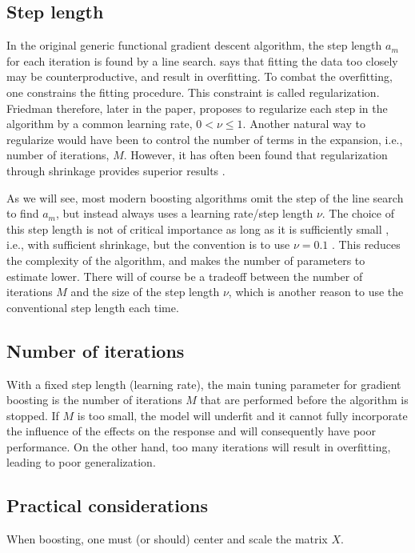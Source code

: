 \subsection{Step length}
In the original generic functional gradient descent algorithm, the step length $a_m$ for each iteration is found by a line search.
\citet{friedman2001} says that fitting the data too closely may be counterproductive, and result in overfitting. To combat the overfitting, one constrains the fitting procedure. This constraint is called regularization. Friedman therefore, later in the paper, proposes to regularize each step in the algorithm by a common learning rate, $0<\nu\leq1$. Another natural way to regularize would have been to control the number of terms in the expansion, i.e., number of iterations, $M$. However, it has often been found that regularization through shrinkage provides superior results \citep{copas1983}.

As we will see, most modern boosting algorithms omit the step of the line search to find $a_m$, but instead always uses a learning rate/step length $\nu$.  
The choice of this step length is not of critical importance as long as it is sufficiently small \citep{schmid-hothorn}, i.e., with sufficient shrinkage, but the convention is to use $\nu=0.1$ \citep{mayr14a}. This reduces the complexity of the algorithm, and makes the number of parameters to estimate lower. There will of course be a tradeoff between the number of iterations $M$ and the size of the step length $\nu$, which is another reason to use the conventional step length each time.

\subsection{Number of iterations}\label{subsec:iterations}
With a fixed step length (learning rate), the main tuning parameter for gradient boosting is the number of iterations $M$ that are performed before the algorithm is stopped. If $M$ is too small, the model will underfit and it cannot fully incorporate the influence of the effects on the response and will consequently have poor performance. On the other hand, too many iterations will result in overfitting, leading to poor generalization.

\subsection{Practical considerations}
When boosting, one must (or should) center and scale the matrix $X$.

